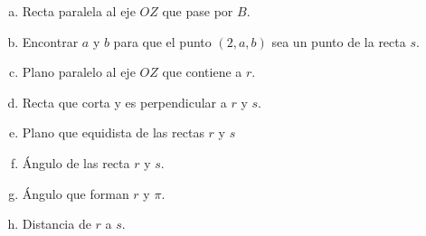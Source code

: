 \begin{enumerate}
\begin{enumerate}[a) ]
\item Recta paralela al eje $OZ$ que pase por $B$.
\item Encontrar $a$ y $b$  para que el punto $(2,a,b)$ sea un punto de la recta $s$.
\item Plano paralelo al eje $OZ$ que contiene a $r$.
\item Recta que corta y es perpendicular a $r$ y $s$.
\item Plano que equidista de las rectas $r$ y $s$
\item Ángulo de las recta $r$ y $s$.
\item  Ángulo que forman $r$ y $\pi$.
\item  Distancia de $r$ a $s$.
\end{enumerate}
\end{enumerate}

\newpage
